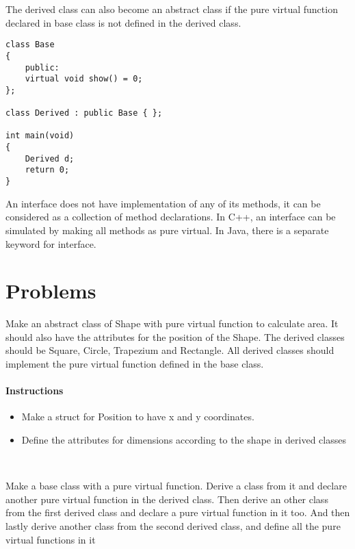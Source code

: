 \documentclass[11pt,fleqn]{book} %
\begin{document}
The derived class can also become an abstract class if the pure virtual function declared in base class is not defined in the derived class.
\begin{example}
\begin{lstlisting}
class Base
{
	public:
	virtual void show() = 0;
};

class Derived : public Base { };

int main(void)
{
	Derived d;
	return 0;
}
\end{lstlisting}
\end{example}
\begin{corollary}
An interface does not have implementation of any of its methods, it can be considered as a collection of method declarations. In C++, an interface can be simulated by making all methods as pure virtual. In Java, there is a separate keyword for interface.
\end{corollary}
\newpage
\section{Problems}
\begin{problem}
	Make an abstract class of Shape with pure virtual function to calculate area. It should also have the attributes for the position of the Shape. The derived classes should be Square, Circle, Trapezium and Rectangle. All derived classes should implement the pure virtual function defined in the base class. 
	\paragraph{Instructions}
	\begin{itemize}
		\item Make a struct for Position to have x and y coordinates.
		\item Define the attributes for dimensions according to the shape in derived classes
	\end{itemize}
\end{problem} ~\\
\begin{problem}
	Make a base class with a pure virtual function. Derive a class from it and declare another pure virtual function in the derived class. Then derive an other class from the first derived class and declare a pure virtual function in it too. And then lastly derive another class from the second derived class, and define all the pure virtual functions in it
\end{problem}
\end{document}

